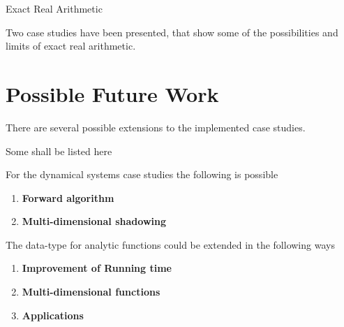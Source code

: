 Exact Real Arithmetic 

Two case studies have been presented, that show some of the possibilities and
limits of exact real arithmetic.


\section{Possible Future Work}
There are several possible extensions to the implemented case studies.

Some shall be listed here

For the dynamical systems case studies the following is possible
\begin{enumerate}
  \item \textbf{Forward algorithm}
  \item \textbf{Multi-dimensional shadowing}
\end{enumerate}

The data-type for analytic functions could be extended in the following ways
\begin{enumerate}
  \item \textbf{Improvement of Running time}
  \item \textbf{Multi-dimensional functions}
  \item \textbf{Applications}
\end{enumerate}
